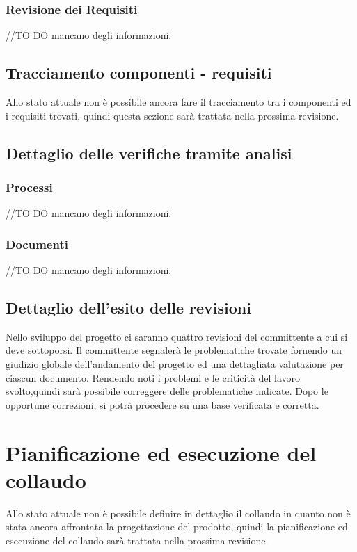 \documentclass[12pt,a4paper]{article}
\begin{document}
\subsubsection{Revisione dei Requisiti}
//TO DO \IB mancano degli informazioni.
\subsection{Tracciamento componenti - requisiti}
Allo stato attuale non è possibile ancora fare il tracciamento tra i componenti ed i requisiti trovati, quindi questa sezione sarà trattata nella prossima revisione.
\subsection{Dettaglio delle verifiche tramite analisi}
\subsubsection{Processi}
//TO DO \IB mancano degli informazioni.
\subsubsection{Documenti}
//TO DO \IB mancano degli informazioni.
\subsection{Dettaglio dell'esito delle revisioni}
Nello sviluppo del progetto ci saranno quattro revisioni del committente a cui si deve sottoporsi. Il committente segnalerà le problematiche trovate fornendo un giudizio globale dell'andamento del progetto ed una dettagliata valutazione per ciascun documento. Rendendo noti i problemi e le criticità del lavoro svolto,quindi sarà possibile correggere delle problematiche indicate. Dopo le opportune correzioni, si potrà procedere su una base verificata e corretta.
\newpage
\section{Pianificazione ed esecuzione del collaudo}
Allo stato attuale non è possibile definire in dettaglio il collaudo in quanto non è stata ancora affrontata la
progettazione del prodotto, quindi la pianificazione ed esecuzione del collaudo sarà trattata nella prossima revisione.
\end{document}
